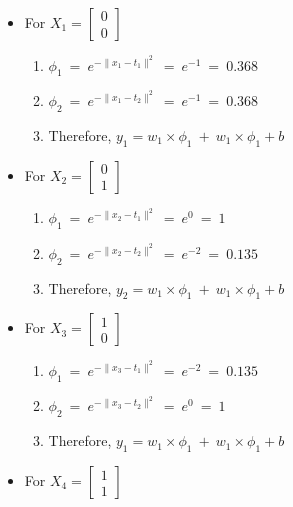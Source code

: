 \documentclass[12pt]{article}
\begin{document}
\begin{itemize}
	\item For $X_1 = \begin{bmatrix}
		0 \\ 0
	\end{bmatrix}$
	
	\begin{enumerate}
		\item $\phi_{1} \ = \ e^{-\parallel x_1- t_1 \parallel ^ 2}  \ = \ e^{-1} \ = \ 0.368 $
		\item $\phi_{2} \ = \ e^{-\parallel x_1- t_2 \parallel ^ 2}  \ = \ e^{-1} \ = \ 0.368 $
		
		\item Therefore, $ y_1 = w_1 \times \phi_{1} \ + \ w_1 \times \phi_{1} + b$
	\end{enumerate}

	\item For $X_2 = \begin{bmatrix}
		0 \\ 1
	\end{bmatrix}$
	
	\begin{enumerate}
		\item $\phi_{1} \ = \ e^{-\parallel x_2- t_1 \parallel ^ 2}  \ = \ e^{0} \ = \ 1 $
		\item $\phi_{2} \ = \ e^{-\parallel x_2- t_2 \parallel ^ 2}  \ = \ e^{-2} \ = \ 0.135 $
		
		\item Therefore, $ y_2 = w_1 \times \phi_{1} \ + \ w_1 \times \phi_{1} + b$
	\end{enumerate}

	\item For $X_3 = \begin{bmatrix}
		1 \\ 0
	\end{bmatrix}$
	
	\begin{enumerate}
		\item $\phi_{1} \ = \ e^{-\parallel x_3- t_1 \parallel ^ 2}  \ = \ e^{-2} \ = \ 0.135 $
		\item $\phi_{2} \ = \ e^{-\parallel x_3- t_2 \parallel ^ 2}  \ = \ e^{0} \ = \ 1 $
		
		\item Therefore, $ y_1 = w_1 \times \phi_{1} \ + \ w_1 \times \phi_{1} + b$
	\end{enumerate}

	\item For $X_4 = \begin{bmatrix}
		1 \\ 1
	\end{bmatrix}$
	

\end{itemize}
\end{document}
